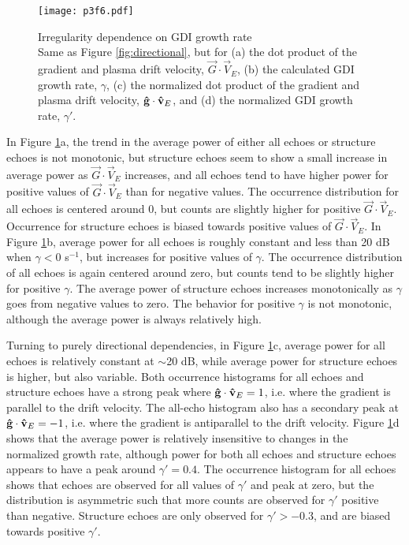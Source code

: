 \begin{figure}
	\texttt{[image: p3f6.pdf]}
  \caption[Irregularity dependence on GDI growth rate]{{\:}Irregularity dependence on GDI growth rate\\ Same as Figure \ref{fig:directional}, but for (a) the dot product of the gradient and plasma drift velocity, \(\vec{G}\cdot\vec{V}_E\), (b) the calculated GDI growth rate, \(\gamma\), (c) the normalized dot product of the  gradient and plasma drift velocity, \(\mathbf{\hat{g}}\cdot\mathbf{\hat{v}}_E\), and (d) the normalized GDI growth rate, \(\gamma'\).}
  \label{fig:gamma}
\end{figure}

In Figure \ref{fig:gamma}a, the trend in the average power of either all echoes or structure echoes is not monotonic, but structure echoes seem to show a small increase in average power as \(\vec{G}\cdot\vec{V}_E\) increases, and all echoes tend to have higher power for positive values of \(\vec{G}\cdot\vec{V}_E\) than for negative values. The occurrence distribution for all echoes is centered around 0, but counts are slightly higher for positive \(\vec{G}\cdot\vec{V}_E\).  Occurrence for structure echoes is biased towards positive values of \(\vec{G}\cdot\vec{V}_E\).  In Figure \ref{fig:gamma}b, average power for all echoes is roughly constant and less than 20 dB when \(\gamma < 0\) s\(^{-1}\), but increases for positive values of \(\gamma\).  The occurrence distribution of all echoes is again centered around zero, but counts tend to be slightly higher for positive \(\gamma\).  The average power of structure echoes increases monotonically as \(\gamma\) goes from negative values to zero.  The behavior for positive \(\gamma\) is not monotonic, although the average power is always relatively high.

Turning to purely directional dependencies, in Figure \ref{fig:gamma}c, average power for all echoes is relatively constant at \(\sim\)20 dB, while average power for structure echoes is higher, but also variable.  Both occurrence histograms for all echoes and structure echoes have a strong peak where \(\mathbf{\hat{g}}\cdot\mathbf{\hat{v}}_E = 1\), i.e. where the gradient is parallel to the drift velocity. The all-echo histogram also has a secondary peak at \(\mathbf{\hat{g}}\cdot\mathbf{\hat{v}}_E = -1\), i.e. where the gradient is antiparallel to the drift velocity.  Figure \ref{fig:gamma}d shows that the average power is relatively insensitive to changes in the normalized growth rate, although power for both all echoes and structure echoes appears to have a peak around \(\gamma'=0.4\).  The occurrence histogram for all echoes shows that echoes are observed for all values of \(\gamma'\) and peak at zero, but the distribution is asymmetric such that more counts are observed for \(\gamma'\) positive than negative.  Structure echoes are only observed for \(\gamma'>-0.3\), and are biased towards positive \(\gamma'\).

